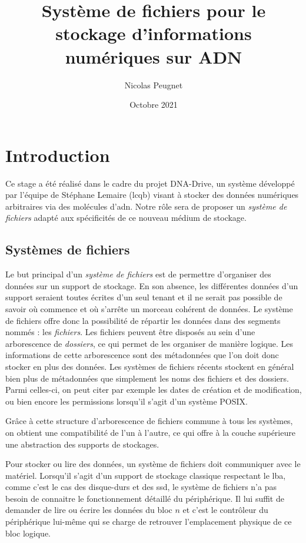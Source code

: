 \documentclass[a4paper]{report}
\title{Système de fichiers pour le stockage d’informations numériques sur ADN}
\date{Octobre 2021}
\author{Nicolas Peugnet}
\begin{document}
\maketitle

\tableofcontents

\chapter{Introduction}

Ce stage a été réalisé dans le cadre du projet DNA-Drive, un système développé par l'équipe de Stéphane Lemaire (\ac{lcqb}) visant à stocker des données numériques arbitraires via des molécules d'\ac{adn}.
Notre rôle sera de proposer un \emph{système de fichiers} adapté aux spécificités de ce nouveau médium de stockage.

\section{Systèmes de fichiers}

Le but principal d'un \emph{système de fichiers} est de permettre d'organiser des données sur un support de stockage.
En son absence, les différentes données d'un support seraient toutes écrites d'un seul tenant
et il ne serait pas possible de savoir où commence et où s'arrête un morceau cohérent de données.
Le système de fichiers offre donc la possibilité de répartir les données dans des segments nommés : les \emph{fichiers}.
Les fichiers peuvent être disposés au sein d'une arborescence de \emph{dossiers},
ce qui permet de les organiser de manière logique.
Les informations de cette arborescence sont des métadonnées que l'on doit donc stocker en plus des données.
Les systèmes de fichiers récents stockent en général bien plus de métadonnées que simplement les noms des fichiers et des dossiers.
Parmi celles-ci, on peut citer par exemple les dates de création et de modification,
ou bien encore les permissions lorsqu'il s'agit d'un système POSIX.

Grâce à cette structure d'arborescence de fichiers commune à tous les systèmes,
on obtient une compatibilité de l'un à l'autre,
ce qui offre à la couche supérieure une abstraction des supports de stockages.

Pour stocker ou lire des données, un système de fichiers doit communiquer avec le matériel.
Lorsqu'il s'agit d'un support de stockage classique respectant le \ac{lba},
comme c'est le cas des disque-durs et des \ac{ssd},
le système de fichiers n'a pas besoin de connaitre le fonctionnement détaillé du périphérique.
Il lui suffit de demander de lire ou écrire les données du bloc $n$
et c'est le contrôleur du périphérique lui-même qui se charge de retrouver l'emplacement physique de ce bloc logique.
\end{document}
